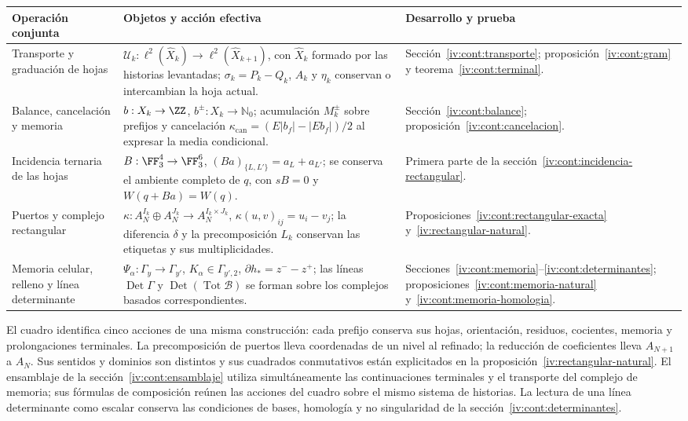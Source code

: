 \begin{center}
\small
\begin{tabular}{@{}p{.21\linewidth}p{.48\linewidth}p{.23\linewidth}@{}}
\toprule
Operación conjunta & Objetos y acción efectiva & Desarrollo y prueba\\
\midrule
Transporte y graduación de hojas
& \(\mathcal U_k:\ell^2(\widehat X_k)\to
\ell^2(\widehat X_{k+1})\), con \(\widehat X_k\) formado por
las historias levantadas; \(\sigma_k=P_k-Q_k\), \(A_k\) y
\(\eta_k\) conservan o intercambian la hoja actual.
& Sección~\ref{iv:cont:transporte}; proposición~\ref{iv:cont:gram}
y teorema~\ref{iv:cont:terminal}.\\[5pt]
Balance, cancelación y memoria
& \(b:X_k\to\ZZ\), \(b^\pm:X_k\to\mathbb N_0\);
acumulación \(M_k^\pm\) sobre prefijos y cancelación
\(\kappa_{\mathrm{can}}=(E|b_f|-|Eb_f|)/2\) al expresar
la media condicional.
& Sección~\ref{iv:cont:balance};
proposición~\ref{iv:cont:cancelacion}.\\[5pt]
Incidencia ternaria de las hojas
& \(B:\FF_3^4\to\FF_3^6\),
\((Ba)_{\{L,L'\}}=a_L+a_{L'}\); se conserva el ambiente
completo de \(q\), con \(sB=0\) y \(W(q+Ba)=W(q)\).
& Primera parte de la
sección~\ref{iv:cont:incidencia-rectangular}.\\[5pt]
Puertos y complejo rectangular
& \(\kappa:A_N^{I_k}\oplus A_N^{J_k}\to
A_N^{I_k\times J_k}\), \(\kappa(u,v)_{ij}=u_i-v_j\);
la diferencia \(\delta\) y la precomposición \(L_k\)
conservan las etiquetas y sus multiplicidades.
& Proposiciones~\ref{iv:cont:rectangular-exacta}
y~\ref{iv:rectangular-natural}.\\[5pt]
Memoria celular, relleno y línea determinante
& \(\Psi_\alpha:\Gamma_y\to\Gamma_{y'}\),
\(K_\alpha\in\Gamma_{y',2}\),
\(\partial h_*=z^--z^+\); las líneas
\(\operatorname{Det}\Gamma\) y
\(\operatorname{Det}(\operatorname{Tot}\mathcal B)\)
se forman sobre los complejos basados correspondientes.
& Secciones~\ref{iv:cont:memoria}--\ref{iv:cont:determinantes};
proposiciones~\ref{iv:cont:memoria-natural}
y~\ref{iv:cont:memoria-homologia}.\\
\bottomrule
\end{tabular}
\end{center}

El cuadro identifica cinco acciones de una misma construcción: cada
prefijo conserva sus hojas, orientación, residuos, cocientes, memoria
y prolongaciones terminales. La precomposición de puertos lleva
coordenadas de un nivel al refinado; la reducción de coeficientes
lleva \(A_{N+1}\) a \(A_N\). Sus sentidos y dominios son
distintos y sus cuadrados conmutativos están explicitados en la
proposición~\ref{iv:rectangular-natural}. El ensamblaje de la
sección~\ref{iv:cont:ensamblaje} utiliza simultáneamente las
continuaciones terminales y el transporte del complejo de memoria;
sus fórmulas de composición reúnen las acciones del cuadro sobre el
mismo sistema de historias. La lectura de una línea determinante
como escalar conserva las condiciones de bases, homología y
no singularidad de la sección~\ref{iv:cont:determinantes}.

